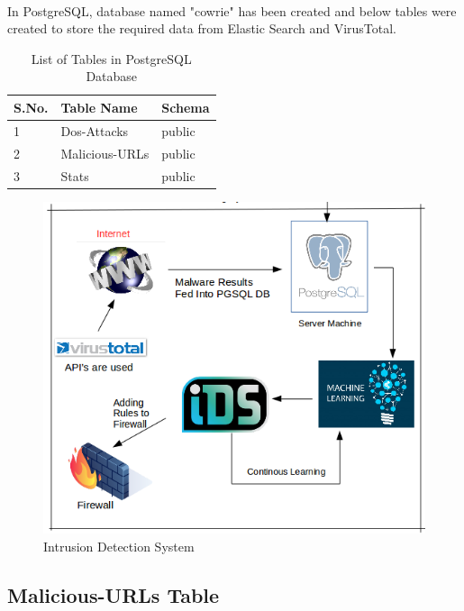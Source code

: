 \documentclass{report}
\begin{document}
\paragraph{}
In PostgreSQL, database named "cowrie" has been created and below tables were created to store the required data from Elastic Search and VirusTotal.

\begin{table}


\begin{tabular}{ |p{2cm}|p{5cm}|p{5cm}|  }
 \hline
 \textbf{S.No.} & \textbf{Table Name} & \textbf{Schema}\\
 \hline
 \hline
 1 & Dos-Attacks & public \\
 \hline
2 & Malicious-URLs & public \\
\hline
3 & Stats & public \\
\hline
\end{tabular}
 \caption{List of Tables in PostgreSQL Database}
\end{table}




\begin{figure}[H]
\centering
\caption{Intrusion Detection System}
\includegraphics[scale=0.7]{Intrusion_Detection_System}
\end{figure}

\subsection{Malicious-URLs Table}
\end{document}
